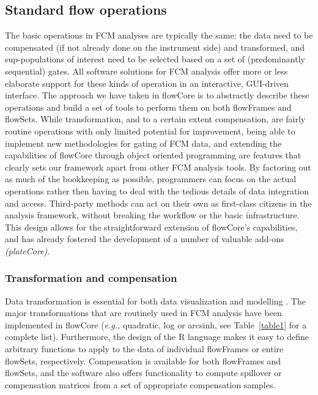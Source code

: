 \documentclass[12pt]{article}
\begin{document}
\subsection*{Standard flow operations}
The basic operations in FCM analyses are typically the same: the data
need to be compensated (if not already done on the instrument side)
and transformed, and sup-populations of interest need to be selected
based on a set of (predominantly sequential) gates. All software
solutions for FCM analysis offer more or less elaborate support for
these kinds of operation in an interactive, GUI-driven interface. The
approach we have taken in flowCore is to abstractly describe these
operations and build a set of tools to perform them on both flowFrames
and flowSets. While transformation, and to a certain extent
compensation, are fairly routine operations with only limited
potential for improvement, being able to implement new methodologies
for gating of FCM data, and extending the capabilities of flowCore
through object oriented programming are features that clearly sets our
framework apart from other FCM analysis tools. By factoring out as
much of the bookkeeping as possible, programmers can focus on the
actual operations rather then having to deal with the tedious details
of data integration and access. Third-party methods can act on their
own as first-class citizens in the analysis framework, without
breaking the workflow or the basic infrastructure. This design allows
for the straightforward extension of flowCore's capabilities, and has
already fostered the development of a number of valuable add-ons
\citep{lo2008agf,sarkar2008ufv} \textit{(plateCore)}.




\subsubsection*{Transformation and compensation}
Data transformation is essential for both data visualization and
modelling \citep{lo2008agf}. The major transformations that are
routinely used in FCM analysis have been implemented in flowCore
(\textit{e.g.,} quadratic, log or arcsinh, see Table~\ref{table1} for a
complete list). Furthermore, the design of the R language makes it
easy to define arbitrary functions to apply to the data of individual
flowFrames or entire flowSets, respectively. Compensation is
available for both flowFrames and flowSets, and the software also
offers functionality to compute spillover or compensation matrices
from a set of appropriate compensation samples.
\end{document}
